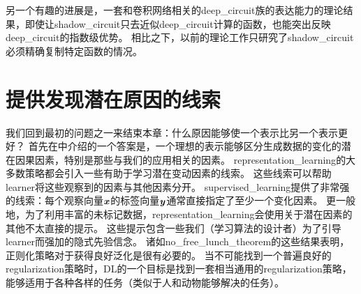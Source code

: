 另一个有趣的进展是，一套和卷积网络相关的\gls{deep_circuit}族的表达能力的理论结果，即使让\gls{shadow_circuit}只去近似\gls{deep_circuit}计算的函数，也能突出反映\gls{deep_circuit}的指数级优势\citep{Cohen-et-al-arXiv2015}。
相比之下，以前的理论工作只研究了\gls{shadow_circuit}必须精确复制特定函数的情况。


\section{提供发现潜在原因的线索}
\label{sec:providing_clues_to_discover_underlying_causes}
我们回到最初的问题之一来结束本章：什么原因能够使一个表示比另一个表示更好？
首先在中介绍的一个答案是，一个理想的表示能够区分生成数据的变化的潜在因果因素，特别是那些与我们的应用相关的因素。
\gls{representation_learning}的大多数策略都会引入一些有助于学习潜在变动因素的线索。
这些线索可以帮助\gls{learner}将这些观察到的因素与其他因素分开。
\gls{supervised_learning}提供了非常强的线索：每个观察向量$\boldsymbol{\mathit{x}}$的标签向量$\boldsymbol{\mathit{y}}$通常直接指定了至少一个变化因素。
更一般地，为了利用丰富的未标记数据，\gls{representation_learning}会使用关于潜在因素的其他不太直接的提示。
这些提示包含一些我们（学习算法的设计者）为了引导\gls{learner}而强加的隐式先验信念。
诸如\gls{no_free_lunch_theorem}的这些结果表明，正则化策略对于获得良好泛化是很有必要的。
当不可能找到一个普遍良好的\gls{regularization}策略时，\gls{DL}的一个目标是找到一套相当通用的\gls{regularization}策略，能够适用于各种各样的任务（类似于人和动物能够解决的任务）。



